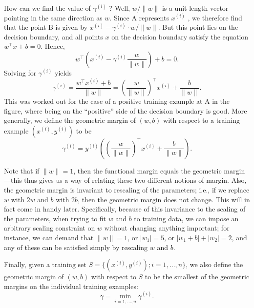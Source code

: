 How can we find the value of $\gamma^{(i)}$ ? Well, $w/\lVert w \lVert$ is a unit-length vector
pointing in the same direction as $w$. Since A represents $x^{(i)}$ , we therefore
find that the point B is given by $x^{(i)} - \gamma^{(i)} \cdot w/\lVert w \rVert$. But this point lies on
the decision boundary, and all points $x$ on the decision boundary satisfy the
equation $w^\top x + b = 0$. Hence,
\begin{equation*}
    w^\top \left(x^{(i)} - \gamma^{(i)} \frac{w}{\lVert w \rVert} \right) + b = 0.    
\end{equation*}
Solving for $\gamma^{(i)}$ yields
\begin{equation*}
    \gamma^{(i)} = \frac{w^\top x^{(i)} + b}{\lVert w \rVert} = \left( \frac{w}{\lVert w \rVert} \right)^\top x^{(i)} + \frac{b}{\lVert w \rVert}.
\end{equation*}
This was worked out for the case of a positive training example at A in the
figure, where being on the ``positive'' side of the decision boundary is good.
More generally, we define the geometric margin of $(w,b)$ with respect to a
training example $(x^{(i)} ,y^{(i)} )$ to be
\begin{equation*}
    \gamma^{(i)} = y^{(i)} \left(\left( \frac{w}{\lVert w \rVert}\right)^\top x^{(i)} + \frac{b}{\lVert w \rVert}\right).
\end{equation*}

Note that if $\lVert w \rVert = 1$, then the functional margin equals the geometric
margin---this thus gives us a way of relating these two different notions of
margin. Also, the geometric margin is invariant to rescaling of the parameters;
i.e., if we replace $w$ with $2w$ and $b$ with $2b$, then the geometric margin
does not change. This will in fact come in handy later. Specifically, because
of this invariance to the scaling of the parameters, when trying to fit $w$ and $b$
to training data, we can impose an arbitrary scaling constraint on $w$ without
changing anything important; for instance, we can demand that $\lVert w \rVert = 1$, or
$|w_1| = 5$, or $|w_1 + b| + |w_2| = 2$, and any of these can be satisfied simply by
rescaling $w$ and $b$.

Finally, given a training set $S = \{(x^{(i)} ,y^{(i)} );i = 1,\ldots ,n\}$, we also define
the geometric margin of $(w,b)$ with respect to $S$ to be the smallest of the
geometric margins on the individual training examples:
\begin{equation*}
    \gamma = \min_{i=1,\ldots ,n} \gamma^{(i)}.
\end{equation*}

